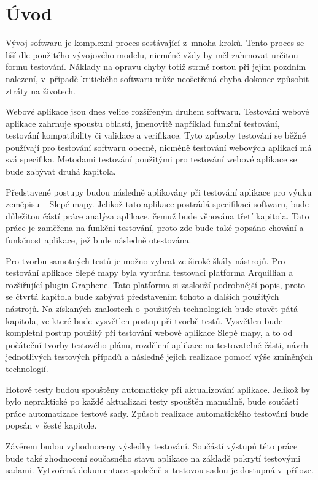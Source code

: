 \documentclass[
    color,   %
	table,   %
    twoside, %
]{fithesis3}
\begin{document}
\chapter{Úvod}
Vývoj softwaru je komplexní proces sestávající z~mnoha kroků. Tento proces se liší dle použitého vývojového modelu, nicméně vždy by měl zahrnovat určitou formu testování. Náklady na opravu chyby totiž strmě rostou při jejím pozdním nalezení, v~případě kritického softwaru může neošetřená chyba dokonce způsobit ztráty na životech.

Webové aplikace jsou dnes velice rozšířeným druhem softwaru. Testování webové aplikace zahrnuje spoustu oblastí, jmenovitě například funkční testování, testování kompatibility či validace a verifikace. Tyto způsoby testování se běžně používají pro testování softwaru obecně, nicméně testování webových aplikací má svá specifika. Metodami testování použitými pro testování webové aplikace se bude zabývat druhá kapitola.

Představené postupy budou následně aplikovány při testování aplikace pro výuku zeměpisu – Slepé mapy\cite{SlepeMapy}. Jelikož tato aplikace postrádá specifikaci softwaru, bude důležitou částí práce analýza aplikace, čemuž bude věnována třetí kapitola. Tato práce je zaměřena na funkční testování, proto zde bude také popsáno chování a funkčnost aplikace, jež bude následně otestována.

Pro tvorbu samotných testů je možno vybrat ze široké škály nástrojů. Pro testování aplikace Slepé mapy byla vybrána testovací platforma Arquillian a rozšiřující plugin Graphene. Tato platforma si zaslouží podrobnější popis, proto se čtvrtá kapitola bude zabývat představením tohoto a dalších použitých nástrojů.
Na získaných znalostech o~použitých technologiích bude stavět pátá kapitola, ve které bude vysvětlen postup při tvorbě testů. Vysvětlen bude kompletní postup použitý při testování webové aplikace Slepé mapy, a to od počáteční tvorby testového plánu, rozdělení aplikace na testovatelné části, návrh jednotlivých testových případů a následně jejich realizace pomocí výše zmíněných technologií.

Hotové testy budou spouštěny automaticky při aktualizování aplikace. Jelikož by bylo  nepraktické po každé aktualizaci testy spouštěn manuálně, bude součástí práce automatizace testové sady. Způsob realizace automatického testování bude popsán v~šesté kapitole.

Závěrem budou vyhodnoceny výsledky testování. Součástí výstupů této práce bude také zhodnocení současného stavu aplikace na základě pokrytí testovými sadami. Vytvořená dokumentace společně s~testovou sadou je dostupná v~příloze.
\end{document}
